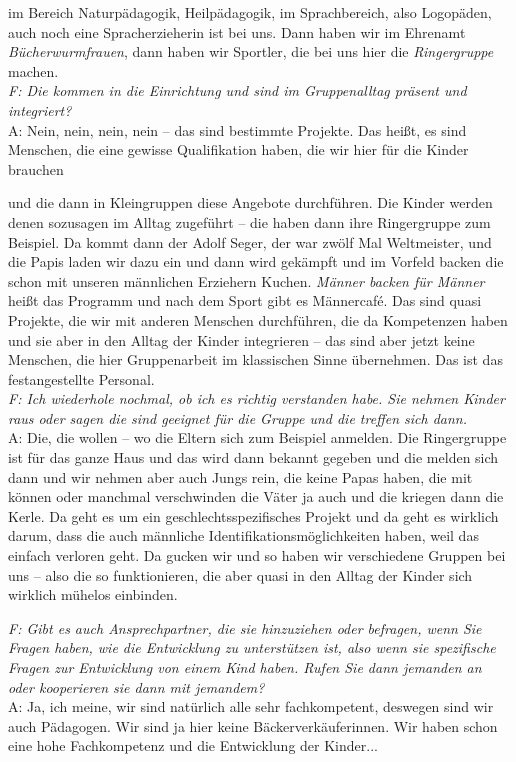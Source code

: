 \begin{linenumbers*}
im Bereich Naturpädagogik, Heilpädagogik, im Sprachbereich, also Logopäden, auch noch eine Spracherzieherin ist bei uns. Dann haben wir im Ehrenamt \emph{Bücherwurmfrauen}, dann haben wir Sportler, die bei uns hier die \emph{Ringergruppe} machen.\\ 
\emph{F: Die kommen in die Einrichtung und sind im Gruppenalltag präsent und integriert?}\\ 
A: Nein, nein, nein, nein -- das sind bestimmte Projekte.
Das heißt, es sind Menschen, die eine gewisse Qualifikation haben, die wir hier für die Kinder brauchen 

und die dann in Kleingruppen diese Angebote durchführen. Die Kinder werden denen sozusagen im Alltag zugeführt -- die haben dann ihre Ringergruppe zum Beispiel. Da kommt dann der Adolf Seger, der war zwölf Mal Weltmeister, und die Papis laden wir dazu ein und dann wird gekämpft und im Vorfeld backen die schon mit unseren männlichen Erziehern Kuchen. \emph{Männer backen für Männer} heißt das Programm und nach dem Sport gibt es Männercafé. Das sind quasi Projekte, die wir mit anderen Menschen durchführen, die da Kompetenzen haben und sie aber in den Alltag der Kinder integrieren -- das sind aber jetzt keine Menschen, die hier Gruppenarbeit im klassischen Sinne übernehmen. Das ist das festangestellte Personal.\\
\emph{F: Ich wiederhole nochmal, ob ich es richtig verstanden habe. Sie nehmen Kinder raus oder sagen die sind geeignet für die Gruppe und die treffen sich dann.}\\
A: Die, die wollen -- wo die Eltern sich zum Beispiel anmelden. Die Ringergruppe ist für das ganze Haus und das wird dann bekannt gegeben und die melden sich dann und wir nehmen aber auch Jungs rein, die keine Papas haben, die mit können oder manchmal verschwinden die Väter ja auch und die kriegen dann die Kerle. Da geht es um ein geschlechtsspezifisches Projekt und da geht es wirklich darum, dass die auch männliche Identifikationsmöglichkeiten haben, weil das einfach verloren geht. Da gucken wir und so haben wir verschiedene Gruppen bei uns -- also die so funktionieren, die aber quasi in den Alltag der Kinder sich wirklich mühelos einbinden.

\emph{F: Gibt es auch Ansprechpartner, die sie hinzuziehen oder befragen, wenn Sie Fragen haben, wie die Entwicklung zu unterstützen ist, also wenn sie spezifische Fragen zur Entwicklung von einem Kind haben. Rufen Sie dann jemanden an oder kooperieren sie dann mit jemandem?}\\
A: Ja, ich meine, wir sind natürlich alle sehr fachkompetent, deswegen sind wir auch Pädagogen. Wir sind ja hier keine Bäckerverkäuferinnen. Wir haben schon eine hohe Fachkompetenz und die Entwicklung der Kinder... 


\end{linenumbers*}
